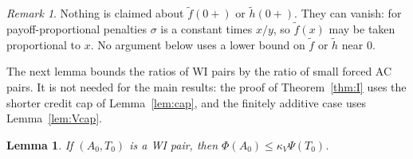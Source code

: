 \documentclass[11pt]{article}
\newtheorem{lemma}[theorem]{Lemma}
\theoremstyle{definition}\newtheorem{definition}[theorem]{Definition}
\theoremstyle{remark}\newtheorem{remark}[theorem]{Remark}
\newcommand{\ftil}{\tilde f}
\newcommand{\htil}{\tilde h}
\begin{document}
\begin{remark}\label{rem:ftil0}
Nothing is claimed about $\ftil(0+)$ or $\htil(0+)$. They can vanish: for
payoff-proportional penalties $\sigma$ is a constant times $x/y$, so
$\ftil(x)$ may be taken proportional to $x$. No argument below uses a lower
bound on $\ftil$ or $\htil$ near $0$.
\end{remark}

The next lemma bounds the ratios of WI pairs by the ratio of small forced AC
pairs. It is not needed for the main results: the proof of Theorem~\ref{thm:I}
uses the shorter credit cap of Lemma~\ref{lem:cap}, and the finitely additive
case uses Lemma~\ref{lem:Vcap}.

\begin{lemma}\label{lem:WI}
If $(A_0,T_0)$ is a WI pair, then $\Phi(A_0)\le\kappa_V\Psi(T_0)$.
\end{lemma}
\end{document}
